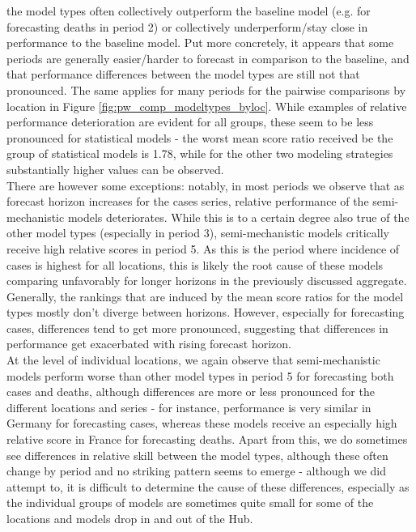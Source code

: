 the model types often collectively outperform the baseline model (e.g. for forecasting deaths in period 2) or collectively underperform/stay close in performance to the baseline model. Put more concretely, it appears that some periods are generally easier/harder to forecast in comparison to the baseline, and that performance differences between the model types are still not that pronounced. The same applies for many periods for the pairwise comparisons by location in Figure \ref{fig:pw_comp_modeltypes_byloc}. While examples of relative performance deterioration are evident for all groups, these seem to be less pronounced for statistical models - the worst mean score ratio received be the group of statistical models is 1.78, while for the other two modeling strategies substantially higher values can be observed.\\
There are however some exceptions: notably, in most periods we observe that as forecast horizon increases for the cases series, relative performance of the semi-mechanistic models deteriorates. While this is to a certain degree also true of the other model types (especially in period 3), semi-mechanistic models critically receive high relative scores in period 5. As this is the period where incidence of cases is highest for all locations, this is likely the root cause of these models comparing unfavorably for longer horizons in the previously discussed aggregate.\\
Generally, the rankings that are induced by the mean score ratios for the model types mostly don't diverge between horizons. However, especially for forecasting cases, differences tend to get more pronounced, suggesting that differences in performance get exacerbated with rising forecast horizon.\\
At the level of individual locations, we again observe that semi-mechanistic models perform worse than other model types in period 5 for forecasting both cases and deaths, although differences are more or less pronounced for the different locations and series - for instance, performance is very similar in Germany for forecasting cases, whereas these models receive an especially high relative score in France for forecasting deaths. Apart from this, we do sometimes see differences in relative skill between the model types, although these often change by period and no striking pattern seems to emerge - although we did attempt to, it is difficult to determine the cause of these differences, especially as the individual groups of models are sometimes quite small for some of the locations and models drop in and out of the Hub.\\

